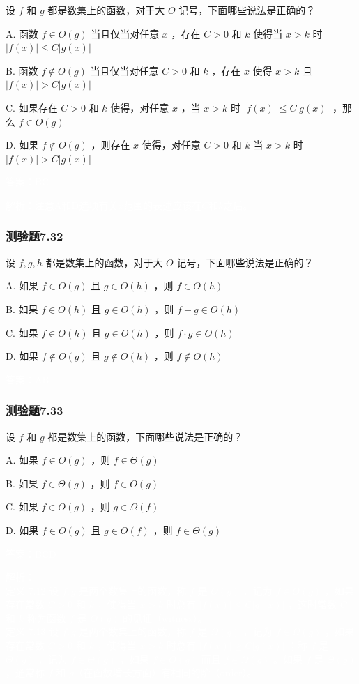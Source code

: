 \documentclass[UTF8, heading=true]{ctexart}
\begin{document}
设 $f$ 和 $g$ 都是数集上的函数，对于大 $O$ 记号，下面哪些说法是正确的？

A. 
函数 $f \in O(g)$ 当且仅当对任意 $x$ ，存在 $C>0$ 和 $k$ 使得当 $x>k$ 时 $|f(x)| \leq C|g(x)|$

B. 
函数 $f \notin O(g)$ 当且仅当对任意 $C>0$ 和 $k$ ，存在 $x$ 使得 $x>k$ 且 $|f(x)|>C|g(x)|$

C. 
如果存在 $C>0$ 和 $k$ 使得，对任意 $x$ ，当 $x>k$ 时 $|f(x)| \leq C|g(x)|$ ，那么 $f \in O(g)$

D.  
如果 $f \notin O(g)$ ，则存在 $x$ 使得，对任意 $C>0$ 和 $k$ 当 $x>k$ 时 $|f(x)|>C|g(x)|$

\textcolor{white}{答案：BC}

\textcolor{white}{解析：注意A和D选项有关$x$范围的表述应该在$C$和$k$之后。}

\subsubsection{测验题7.32}

设 $f, g, h$ 都是数集上的函数，对于大 $O$ 记号，下面哪些说法是正确的？

A. 如果 $f \in O(g)$ 且 $g \in O(h)$ ，则 $f \in O(h)$

B. 如果 $f \in O(h)$ 且 $g \in O(h)$ ，则 $f+g \in O(h)$

C. 如果 $f \in O(h)$ 且 $g \in O(h)$ ，则 $f \cdot g \in O(h)$

D.  如果 $f \notin O(g)$ 且 $g \notin O(h)$ ，则 $f \notin O(h)$

\textcolor{white}{答案：AB}

\subsubsection{测验题7.33}

设 $f$ 和 $g$ 都是数集上的函数，下面哪些说法是正确的？

A. 如果 $f \in O(g)$ ，则 $f \in \Theta(g)$

B. 如果 $f \in \Theta(g)$ ，则 $f \in O(g)$

C. 如果 $f \in O(g)$ ，则 $g \in \Omega(f)$

D.  如果 $f \in O(g)$ 且 $g \in O(f)$ ，则 $f \in \Theta(g)$

\textcolor{white}{答案：BCD}

\textcolor{white}{解析：\\ \indent 定义 7.12 设 $f, g$ 是两个数集上的函数，称 $f$ 是 $O(g)$ ，记为 $f \in O(g)$ ，如果存在常数 $C>0$ 和 $k$ ，使得当 $x>k$ 时总有 $|f(x)| \leq C|g(x)|$ ，这时常数 $C$ 和 $k$ 称为函数 $f$ 是 $O(g)$ 的见证（witness）。
\\ \indent 定义 7.13 设 $f, g$ 是两个数集上的函数，称 $f$ 是 $\Omega(g)$ ，记为 $f \in \Omega(g)$ ，如果存在常数 $C>0$ 和 $k$ ，使得当 $x>k$ 时总有 $|f(x)| \geq C|g(x)|$ ；称 $f$ 是 $\Theta(g)$ ，记为 $f \in \Theta(g)$ ，如果 $f \in O(g)$ 而且 $f \in \Omega(g)$ 。如果 $f$ 是 $\Theta(g)$ ，通常称 $f$ 和 $g$（在函数增长方面）有相同的阶（order）。}
\end{document}
